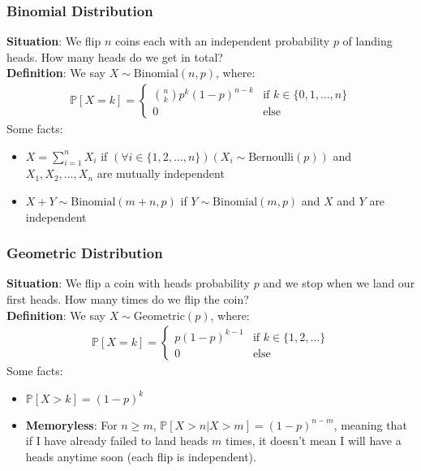 \documentclass{beamer}
\begin{document}
\begin{frame}
    \frametitle{Binomial Distribution}
    {\bf Situation}: We flip $n$ coins each with an independent probability $p$ of landing heads. How many heads do we get in total?\\
    {\bf Definition}: We say $X\sim\text{Binomial}(n,p)$, where:
    \begin{gather*}
        \mathbb{P}[X=k]=\begin{cases}
            \binom{n}{k}p^k(1-p)^{n-k}&\text{if }k\in\{0,1,\dots,n\}\\
            0&\text{else}
        \end{cases}
    \end{gather*}
    Some facts:
    \begin{itemize}
        \item $X=\sum_{i=1}^n X_i$ if $(\forall i\in\{1,2,\dots,n\})(X_i\sim\text{Bernoulli}(p))$ and $X_1,X_2,\dots,X_n$ are mutually independent
        \item $X+Y\sim\text{Binomial}(m+n,p)$ if $Y\sim\text{Binomial}(m,p)$ and $X$ and $Y$ are independent
    \end{itemize}
\end{frame}

\begin{frame}
    \frametitle{Geometric Distribution}
    {\bf Situation}: We flip a coin with heads probability $p$ and we stop when we land our first heads. How many times do we flip the coin?\\
    {\bf Definition}: We say $X\sim\text{Geometric}(p)$, where:
    \begin{gather*}
        \mathbb{P}[X=k]=\begin{cases}
            p(1-p)^{k-1}&\text{if }k\in\{1,2,\dots\}\\
            0&\text{else}
        \end{cases}
    \end{gather*}
    Some facts:
    \begin{itemize}
        \item $\mathbb{P}[X>k]=(1-p)^k$
        \item {\bf Memoryless}: For $n\geq m$, $\mathbb{P}[X>n|X>m]=(1-p)^{n-m}$, meaning that if I have already failed to land heads $m$ times, it doesn't mean I will have a heads anytime soon (each flip is independent).
    \end{itemize}
\end{frame}
\end{document}
